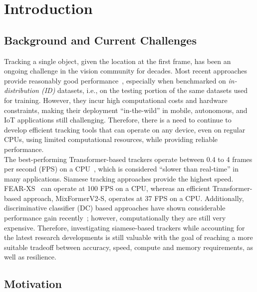 
\chapter{Introduction} %

\label{Chapter1} %


\section{Background and Current Challenges}

Tracking a single object, given the location at the first frame, has been an ongoing challenge in the vision community for decades. Most recent approaches provide reasonably good performance~\cite{gao2022aiatrack,he2023target,yan2021learning,wei2023autoregressive,chen2023seqtrack}, especially when benchmarked on \emph{in-distribution (ID)} datasets, i.e., on the testing portion of the same datasets used for training. However, they incur high computational costs and hardware constraints, making their deployment ``in-the-wild'' in mobile, autonomous, and IoT applications still challenging. Therefore, there is a need to continue to develop efficient tracking tools that can operate on any device, even on regular CPUs, using limited computational resources, while providing reliable performance.  \\

The best-performing Transformer-based trackers operate between 0.4 to 4 frames per second (FPS) on a CPU~\cite{chen2023seqtrack,wu2023dropmae}, which is considered ``slower than real-time'' in many applications. Siamese tracking approaches provide the highest speed. FEAR-XS~\cite{borsuk2022fear} can operate at 100 FPS on a CPU, whereas an efficient Transformer-based approach, MixFormerV2-S\cite{cui2024mixformerv2}, operates at 37 FPS on a CPU.  Additionally, discriminative classiﬁer (DC) based approaches have shown considerable performance gain recently~\cite{bhat2020know,bhat2019learning,mayer2021learning}; however, computationally they are still very expensive. Therefore, investigating siamese-based trackers while accounting for the latest research developments is still valuable with the goal of reaching a more suitable tradeoff between accuracy, speed, compute and memory requirements, as well as resilience.

\section{Motivation}

